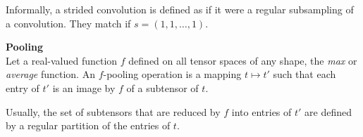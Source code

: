 \begin{remark}
Informally, a strided convolution is defined as if it were a regular subsampling of a convolution. They match if $s = (1,1,\ldots,1)$.
\end{remark}

\begin{definition}\textbf{Pooling}\\
Let a real-valued function $f$ defined on all tensor spaces of any shape, \eg the \emph{max} or \emph{average} function.
An $f$-pooling operation is a mapping $t \mapsto t'$ such that each entry of $t'$ is an image by $f$ of a subtensor of $t$.
\end{definition}

\begin{remark}
Usually, the set of subtensors that are reduced by $f$ into entries of $t'$ are defined by a regular partition of the entries of $t$.
\end{remark}